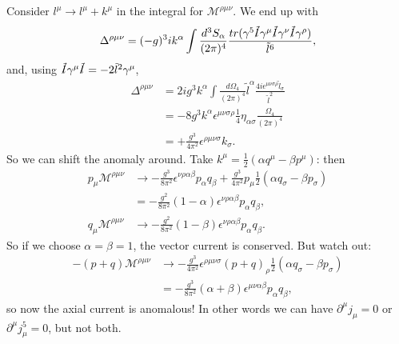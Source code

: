 Consider $l^\mu \to l^\mu + k^\mu$ in the integral for $\mathcal{M}^{\rho \mu \nu}$. We end up with
\begin{equation}
\Delta^{\rho \mu \nu} = (-g)^3 ik^\alpha \int \frac{d^3 S_\alpha}{(2\pi)^4} \frac{tr(\gamma^5 \slashed{\tilde{l}}\gamma^\mu \slashed{\tilde{l}}\gamma^\nu \slashed{\tilde{l}}\gamma^\rho)}{\tilde{l}^6},
\end{equation}
and, using $\slashed{\tilde{l}}\gamma^\mu \slashed{\tilde{l}} = -2\tilde{l}^2\gamma^\mu$,
\begin{equation}
\begin{split}
\Delta^{\rho \mu \nu} &= 2ig^3 k^\alpha \int \frac{d\Omega_4}{(2\pi)^4} \tilde{l}^\alpha \frac{4i\epsilon^{\mu \nu \sigma \rho} \tilde{l}_\sigma}{\tilde{l}^2} \\
&= - 8 g^3 k^\alpha \epsilon^{\mu \nu \sigma \rho} \frac{1}{4} \eta_{\alpha \sigma} \frac{\Omega_4}{(2\pi)^4} \\
&= + \frac{g^3}{4\pi^2} \epsilon^{\rho \mu \nu \sigma} k_\sigma.
\end{split}
\end{equation}
So we can shift the anomaly around. Take $k^\mu = \frac{1}{2}(\alpha q^\mu - \beta p^\mu)$: then
\begin{equation}
\begin{split}
p_\mu\mathcal{M}^{\rho \mu \nu} &\to - \frac{g^3}{8\pi^2} \epsilon^{\nu \rho \alpha \beta}p_\alpha q_\beta + \frac{g^3}{4\pi^2} p_\mu\frac{1}{2}(\alpha q_\sigma - \beta p_\sigma) \\
&= -\frac{g^2}{8\pi^2} (1-\alpha) \epsilon^{\nu \rho\alpha \beta}p_\alpha q_\beta, \\
q_\mu\mathcal{M}^{\rho \mu \nu} &\to -\frac{g^2}{8\pi^2} (1-\beta) \epsilon^{\nu \rho\alpha \beta}p_\alpha q_\beta.
\end{split}
\end{equation}
So if we choose $\alpha = \beta = 1$, the vector current is conserved. But watch out:
\begin{equation}
\begin{split}
-(p+q)\mathcal{M}^{\rho \mu \nu} &\to - \frac{g^3}{4\pi^2} \epsilon^{\rho \mu \nu \sigma}(p+q)_\rho \frac{1}{2}(\alpha q_\sigma - \beta p_\sigma) \\
&= -\frac{g^3}{8\pi^2}(\alpha + \beta) \epsilon^{\mu \nu \alpha \beta}p_\alpha q_\beta,
\end{split}
\end{equation}
so now the axial current is anomalous! In other words we can have $\partial^\mu j_\mu = 0$ or $\partial^\mu j_\mu^5 = 0$, but not both. 

